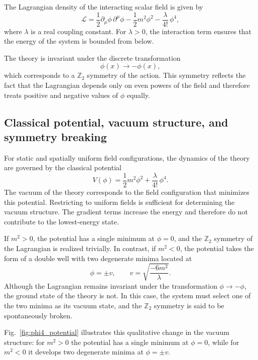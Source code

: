 The Lagrangian density of the interacting scalar field is given by
\begin{equation}
\mathcal{L}
= \frac{1}{2}\partial_\mu \phi\,\partial^\mu \phi
- \frac{1}{2} m^2 \phi^2
- \frac{\lambda}{4!}\,\phi^4 ,
\end{equation}
where $\lambda$ is a real coupling constant. For $\lambda>0$, the interaction
term ensures that the energy of the system is bounded from below.

The theory is invariant under the discrete transformation
\begin{equation}
\phi(x) \rightarrow -\phi(x) ,
\end{equation}
which corresponds to a $\mathbb{Z}_2$ symmetry of the action. This symmetry
reflects the fact that the Lagrangian depends only on even powers of the field
and therefore treats positive and negative values of $\phi$ equally.

\subsection*{Classical potential, vacuum structure, and symmetry breaking}

For static and spatially uniform field configurations, the dynamics of the
theory are governed by the classical potential
\begin{equation}
V(\phi)
= \frac{1}{2} m^2 \phi^2
+ \frac{\lambda}{4!}\,\phi^4 .
\label{eq:classic_potential}
\end{equation}
The vacuum of the theory corresponds to the field configuration that minimizes
this potential. Restricting to uniform fields is sufficient for determining the
vacuum structure. The gradient terms increase the energy and therefore do not
contribute to the lowest-energy state.

If $m^2>0$, the potential has a single minimum at $\phi=0$, and the
$\mathbb{Z}_2$ symmetry of the Lagrangian is realized trivially. In contrast, if
$m^2<0$, the potential takes the form of a double well with two degenerate minima
located at
\begin{equation}
\phi = \pm v, \qquad
v = \sqrt{\frac{-6m^2}{\lambda}} .
\end{equation}
Although the Lagrangian remains invariant under the transformation
$\phi \rightarrow -\phi$, the ground state of the theory is not. In this case,
the system must select one of the two minima as its vacuum state, and the
$\mathbb{Z}_2$ symmetry is said to be spontaneously broken.

Fig.~\ref{fig:phi4_potential} illustrates this qualitative change in the vacuum
structure: for $m^2>0$ the potential has a single minimum at $\phi=0$, while for
$m^2<0$ it develops two degenerate minima at $\phi=\pm v$.

